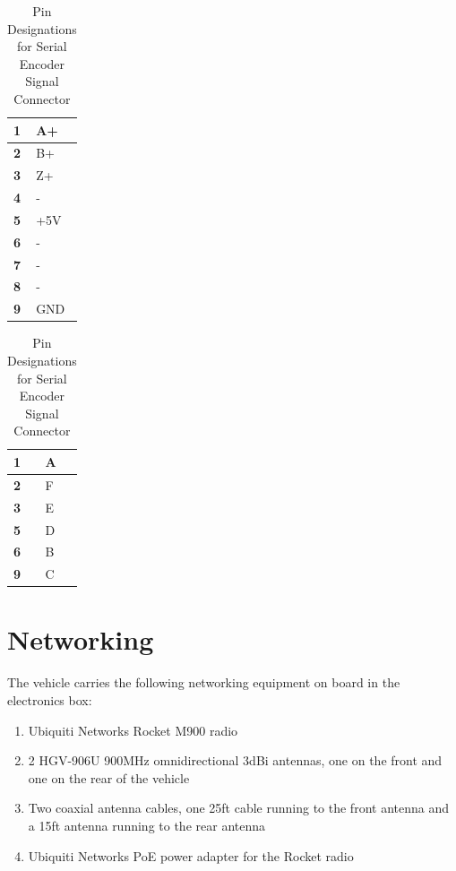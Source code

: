 \begin{table}[H]
\centering
\caption{Pin Designations for Serial Encoder Signal Connector}
\label{pintable}
\begin{tabular}{|l|l|}
\hline
\textbf{1} & A+  \\ \hline
\textbf{2} & B+  \\ \hline
\textbf{3} & Z+ \\ \hline
\textbf{4} & - \\ \hline
\textbf{5} & +5V  \\ \hline
\textbf{6} & -  \\ \hline
\textbf{7} & -  \\ \hline
\textbf{8} & -  \\ \hline
\textbf{9} & GND  \\ \hline
\end{tabular}
\end{table}

\newpage

\begin{table}[H]
\centering
\caption{Pin Designations for Serial Encoder Signal Connector}
\label{pintable}
\begin{tabular}{|l|l|}
\hline
\textbf{1} & A  \\ \hline
\textbf{2} & F  \\ \hline
\textbf{3} & E \\ \hline
\textbf{5} & D\\ \hline
\textbf{6} & B \\ \hline
\textbf{9} & C \\ \hline
\end{tabular}
\end{table}

\section{Networking}
\noindent The vehicle carries the following networking equipment on board in the electronics box:\\
\begin{enumerate}
\item Ubiquiti Networks Rocket M900 radio
\item 2 HGV-906U 900MHz omnidirectional 3dBi antennas, one on the front and one on the rear of the vehicle
\item Two coaxial antenna cables, one 25ft cable running to the front antenna and a 15ft antenna running to the rear antenna
\item Ubiquiti Networks PoE power adapter for the Rocket radio
\end{enumerate}


